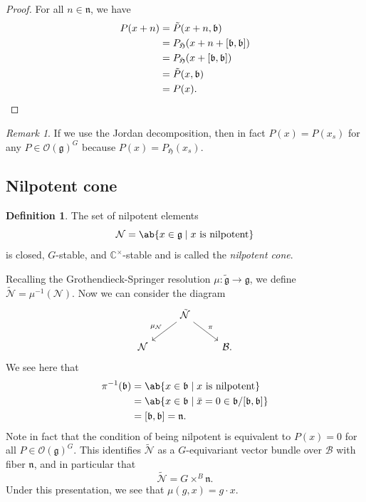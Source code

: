 \documentclass{amsart}
\theoremstyle{definition}
\newtheorem{defn}[thm]{Definition}
\theoremstyle{remark}
\newtheorem{rmk}[thm]{Remark}
\theoremstyle{plain}
\theoremstyle{definition}
\theoremstyle{remark}
\newcommand{\C}{\mathbb{C}}
\newcommand{\g}{\mathfrak{g}}
\newcommand{\n}{\mathfrak{n}}
\renewcommand{\b}{\mathfrak{b}}
\newcommand{\mc}[1]{\mathcal{#1}}
\newcommand{\mf}[1]{\mathfrak{#1}}
\newcommand{\1}{\mathbf{1}}
\newcommand{\2}{\mathbf{2}}
\newcommand{\3}{\mathbf{3}}
\begin{document}
\begin{proof}
    For all \(n \in \n\), we have
    \begin{align*}
        P(x + n) &= \tilde{P}(x+n, \b) \\
        &= P_{\mf{H}} (x + n + [\b, \b]) \\
        &= P_{\mf{H}}(x + [\b, \b]) \\
        &= \tilde{P}(x, \b) \\
        &= P(x). \qedhere
    \end{align*}
\end{proof}

\begin{rmk}
    If we use the Jordan decomposition, then in fact \(P(x) = P(x_s)\) for any \(P \in \mc{O}(\g)^G\) because \(P(x) = P_{\mf{H}}(x_s)\).
\end{rmk}

\subsection{Nilpotent cone}%
\label{sub:Nilpotent cone}

\begin{defn}
    The set of nilpotent elements
    \[ \mc{N} = \ab\{ x \in \g \mid x \text{ is nilpotent} \} \]
    is closed, \(G\)-stable, and \(\C^{\times}\)-stable and is called the \textit{nilpotent cone}.
\end{defn}

Recalling the Grothendieck-Springer resolution \(\mu \colon \tilde{\g} \to \g\), we define \(\tilde{\mc{N}} = \mu^{-1}(\mc{N})\). Now we can consider the diagram
\begin{equation*}
\begin{tikzcd}
    & \tilde{\mc{N}} \ar{dl}[swap]{\mu_{\mc{N}}} \ar{dr}{\pi} \\
    \mc{N} & & \mc{B}.
\end{tikzcd}
\end{equation*}
We see here that
\begin{align*}
    \pi^{-1}(\b) &= \ab\{ x \in \b \mid x \text{ is nilpotent} \} \\
    &= \ab\{ x \in \b \mid \bar{x} = 0 \in \b / [\b,\b] \} \\
    &= [\b, \b] = \n.
\end{align*}
Note in fact that the condition of being nilpotent is equivalent to \(P(x) = 0\) for all \(P \in \mc{O}(\g)^G\). This identifies \(\tilde{\mc{N}}\) as a \(G\)-equivariant vector bundle over \(\mc{B}\) with fiber \(\n\), and in particular that
\[ \tilde{\mc{N}} = G \times^B \n. \]
Under this presentation, we see that \(\mu(g,x) = g \cdot x\).
\end{document}

